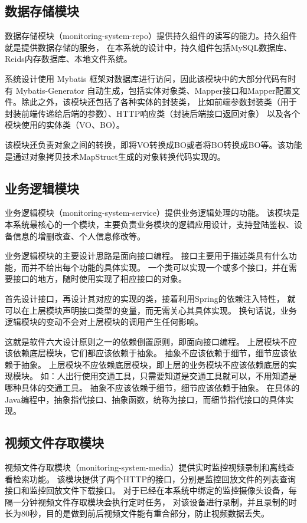 \subsection{数据存储模块}
数据存储模块（monitoring-system-repo）提供持久组件的读写的能力。持久组件就是提供数据存储的服务，
在本系统的设计中，持久组件包括MySQL数据库、Reids内存数据库、本地文件系统。

系统设计使用 Mybatis 框架对数据库进行访问，因此该模块中的大部分代码有时有 Mybatis-Generator
自动生成，包括实体对象类、Mapper接口和Mapper配置文件。除此之外，该模块还包括了各种实体的封装类，
比如前端参数封装类（用于封装前端传递给后端的参数）、HTTP响应类（封装后端接口返回对象）
以及各个模块使用的实体类（VO、BO）。

该模块还负责对象之间的转换，即将VO转换成BO或者将BO转换成BO等。该功能是通过对象拷贝技术MapStruct生成的对象转换代码实现的。

\subsection{业务逻辑模块}
业务逻辑模块（monitoring-system-service）提供业务逻辑处理的功能。
该模块是本系统最核心的一个模块，主要负责业务模块的逻辑应用设计，支持登陆鉴权、设备信息的增删改查、个人信息修改等。

业务逻辑模块的主要设计思路是面向接口编程。
接口主要用于描述类具有什么功能，而并不给出每个功能的具体实现。
一个类可以实现一个或多个接口，并在需要接口的地方，随时使用实现了相应接口的对象。

首先设计接口，再设计其对应的实现的类，接着利用Spring的依赖注入特性，
就可以在上层模块声明接口类型的变量，而无需关心其具体实现。
换句话说，业务逻辑模块的变动不会对上层模块的调用产生任何影响。

这就是软件六大设计原则之一的依赖倒置原则，即面向接口编程。
上层模块不应该依赖底层模块，它们都应该依赖于抽象。
抽象不应该依赖于细节，细节应该依赖于抽象。
上层模块不应依赖底层模块，即上层的业务模块不应该依赖底层的实现模块。
如：人出行使用交通工具，只需要知道是交通工具就可以，不用知道是哪种具体的交通工具。
抽象不应该依赖于细节，细节应该依赖于抽象。
在具体的Java编程中，抽象指代接口、抽象函数，统称为接口，而细节指代接口的具体实现。

\subsection{视频文件存取模块}
视频文件存取模块（monitoring-system-media）提供实时监控视频录制和离线查看检索功能。
该模块提供了两个HTTP的接口，分别是监控回放文件的列表查询接口和监控回放文件下载接口。
对于已经在本系统中绑定的监控摄像头设备，每隔一分钟视频文件存取模块会执行定时任务，
对该设备进行录制，并且录制的时长为80秒，目的是做到前后视频文件能有重合部分，防止视频数据丢失。

